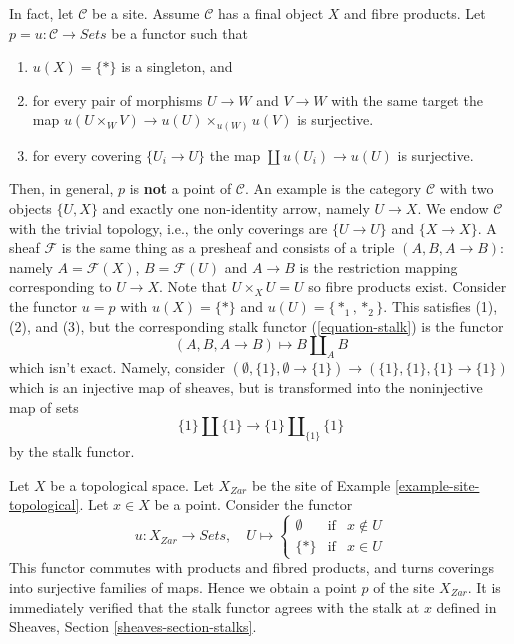 \begin{remark}
\label{remark-improve-proposition-points-limits}
In fact, let $\mathcal{C}$ be a site. Assume $\mathcal{C}$ has a final object
$X$  and fibre products. Let $p = u: \mathcal{C} \to \textit{Sets}$ be a
functor such that
\begin{enumerate}
\item $u(X) = \{*\}$ is a singleton, and
\item for every pair of morphisms $U \to W$ and $V \to W$ with
the same target the map
$u(U \times_W V) \to u(U) \times_{u(W)} u(V)$ is surjective.
\item for every covering $\{U_i \to U\}$ the map
$\coprod u(U_i) \to u(U)$ is surjective.
\end{enumerate}
Then, in general, $p$ is {\bf not} a point of $\mathcal{C}$.
An example is the category $\mathcal{C}$ with two objects $\{U, X\}$
and exactly one non-identity arrow, namely $U \to X$. We endow $\mathcal{C}$
with the trivial topology, i.e., the only coverings are $\{U \to U\}$ and
$\{X \to X\}$. A sheaf $\mathcal{F}$ is the same thing as a presheaf and
consists of a triple $(A, B, A \to B)$: namely $A = \mathcal{F}(X)$,
$B = \mathcal{F}(U)$ and $A \to B$ is the restriction mapping corresponding
to $U \to X$. Note that $U \times_X U = U$ so fibre products exist.
Consider the functor $u = p$ with $u(X) = \{*\}$ and $u(U) = \{*_1, *_2\}$.
This satisfies (1), (2), and (3), but the corresponding stalk functor
(\ref{equation-stalk}) is the functor
$$
(A, B, A \to B) \longmapsto B \amalg_A B
$$
which isn't exact. Namely, consider
$(\emptyset, \{1\}, \emptyset \to \{1\}) \to (\{1\}, \{1\}, \{1\} \to \{1\})$
which is an injective map of sheaves, but is transformed into the noninjective
map of sets
$$
\{1\} \amalg \{1\} \longrightarrow \{1\} \amalg_{\{1\}} \{1\}
$$
by the stalk functor.
\end{remark}

\begin{example}
\label{example-point-topological}
Let $X$ be a topological space. Let $X_{Zar}$ be the site of
Example \ref{example-site-topological}.
Let $x \in X$ be a point. Consider the functor
$$
u : X_{Zar} \longrightarrow \textit{Sets}, \quad
U \mapsto
\left\{
\begin{matrix}
\emptyset & \text{if} & x \not \in U \\
\{*\} & \text{if} & x \in U
\end{matrix}
\right.
$$
This functor commutes with products and fibred products,
and turns coverings into surjective families of maps.
Hence we obtain a point $p$ of the site $X_{Zar}$.
It is immediately verified that the stalk functor
agrees with the stalk at $x$ defined in
Sheaves, Section
\ref{sheaves-section-stalks}.
\end{example}


